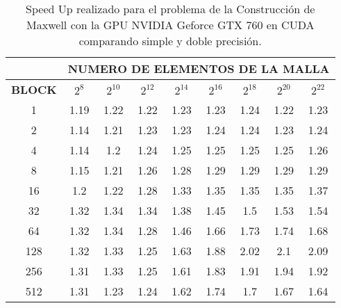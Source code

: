 \begin{table}[h!]
    \begin{tabular}{|c|c|c|c|c|c|c|c|c|}
    \hline
                   & \multicolumn{8}{c|}{\textbf{NUMERO DE ELEMENTOS DE LA MALLA}} \\ \hline
    \textbf{BLOCK} & $2^8$ & $2^10$& $2^12$& $2^14$& $2^16$& $2^18$& $2^20$& $2^22$\\ \hline
    1              & 1.19  & 1.22  & 1.22  & 1.23  & 1.23  & 1.24  & 1.22  & 1.23  \\ \hline
    2              & 1.14  & 1.21  & 1.23  & 1.23  & 1.24  & 1.24  & 1.23  & 1.24  \\ \hline
    4              & 1.14  & 1.2   & 1.24  & 1.25  & 1.25  & 1.25  & 1.25  & 1.26  \\ \hline
    8              & 1.15  & 1.21  & 1.26  & 1.28  & 1.29  & 1.29  & 1.29  & 1.29  \\ \hline
    16             & 1.2   & 1.22  & 1.28  & 1.33  & 1.35  & 1.35  & 1.35  & 1.37  \\ \hline
    32             & 1.32  & 1.34  & 1.34  & 1.38  & 1.45  & 1.5   & 1.53  & 1.54  \\ \hline
    64             & 1.32  & 1.34  & 1.28  & 1.46  & 1.66  & 1.73  & 1.74  & 1.68  \\ \hline
    128            & 1.32  & 1.33  & 1.25  & 1.63  & 1.88  & 2.02  & 2.1   & 2.09  \\ \hline
    256            & 1.31  & 1.33  & 1.25  & 1.61  & 1.83  & 1.91  & 1.94  & 1.92  \\ \hline
    512            & 1.31  & 1.23  & 1.24  & 1.62  & 1.74  & 1.7   & 1.67  & 1.64  \\ \hline
    \end{tabular}
    \caption{Speed Up realizado para el problema de la Construcción de Maxwell con la GPU NVIDIA Geforce GTX 760 en CUDA comparando simple y doble precisión.}
    \label{tab:c_760_MxC_cuda_10}
    \end{table}

